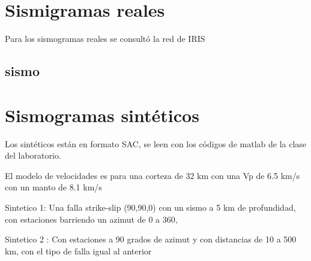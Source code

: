 \documentclass[../main.tex]{subfiles}
\begin{document}
\section{Sismigramas reales}
Para los sismogramas reales se consultó la red de IRIS 


\subsection{sismo}

\section{Sismogramas sintéticos}

Los sintéticos están en formato SAC, se leen con los códigos de matlab de la clase del laboratorio.

El modelo de velocidades es para una corteza de 32 km con una Vp de 6.5 km/s con un manto de 8.1 km/s

Sintetico 1: Una falla strike-slip (90,90,0) con un sismo a 5 km de profundidad, con estaciones barriendo un azimut de 0 a 360,

Sintetico 2 : Con estaciones a 90 grados de azimut y con distancias de 10 a 500 km, con el tipo de falla igual al anterior

\subsection{}
\end{document}
